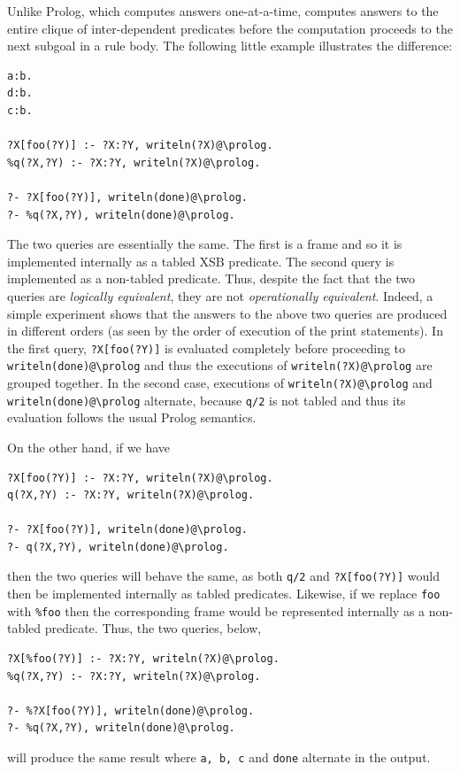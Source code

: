 \documentclass[11pt]{article}
\newcommand{\ERGO}{\mbox{\smaller{\ensuremath{\cal{E}}\smaller{{\sc{RGO}}}}}\xspace}
\newcommand{\FLSYSTEM}{\ERGO}
\newcommand{\bs}{\textbackslash}
\begin{document}
Unlike Prolog, which computes answers one-at-a-time, \FLSYSTEM computes
answers to the entire clique of inter-dependent
predicates before the computation proceeds to the next subgoal
in a rule body. The following little example illustrates the difference:
\begin{verbatim}
a:b.
d:b.
c:b.

?X[foo(?Y)] :- ?X:?Y, writeln(?X)@\prolog.
%q(?X,?Y) :- ?X:?Y, writeln(?X)@\prolog.

?- ?X[foo(?Y)], writeln(done)@\prolog.
?- %q(?X,?Y), writeln(done)@\prolog.
\end{verbatim}
The two queries are essentially the same. The first is a frame
and so it is implemented internally as a tabled XSB predicate. The
second query is implemented as a non-tabled predicate.  Thus, despite
the fact that the two queries are \emph{logically equivalent}, they are
not \emph{operationally equivalent}.  Indeed, a
simple experiment shows that the answers to the above two queries are
produced in different orders (as seen by the order of execution of the
print statements).  In the first query, \verb|?X[foo(?Y)]| is evaluated
completely before proceeding to {\tt writeln(done)@\bs{}prolog} and thus
the executions of {\tt writeln(?X)@\bs{}prolog} are grouped together. In the
second case, executions of {\tt writeln(?X)@\bs{}prolog} and {\tt
writeln(done)@\bs{}prolog} alternate, because {\tt \verb|q|/2} is not tabled
and thus its evaluation follows the usual Prolog semantics.

On the other hand, if we have
\begin{verbatim}
?X[foo(?Y)] :- ?X:?Y, writeln(?X)@\prolog.
q(?X,?Y) :- ?X:?Y, writeln(?X)@\prolog.

?- ?X[foo(?Y)], writeln(done)@\prolog.
?- q(?X,?Y), writeln(done)@\prolog.
\end{verbatim}
then the two queries will behave the same, as both {\tt q/2} and
\verb|?X[foo(?Y)]| would then be implemented internally as tabled predicates.
Likewise, if we replace {\tt foo} with {\tt \%foo} then the corresponding
frame would be represented internally as a non-tabled predicate.
Thus, the two queries, below,
\begin{verbatim}
?X[%foo(?Y)] :- ?X:?Y, writeln(?X)@\prolog.
%q(?X,?Y) :- ?X:?Y, writeln(?X)@\prolog.

?- %?X[foo(?Y)], writeln(done)@\prolog.
?- %q(?X,?Y), writeln(done)@\prolog.
\end{verbatim}
will produce the same result where {\tt a, b, c} and {\tt done}
alternate in the output.
\end{document}

